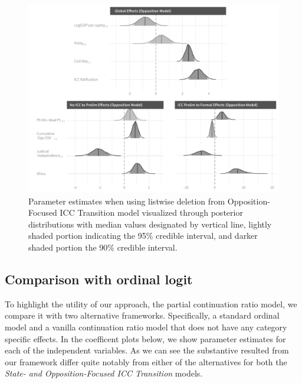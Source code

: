 \begin{figure}
    \centering
    \includegraphics[width=1\textwidth]{rebelCoefSumm_noImp.pdf}
    \caption{Parameter estimates when using listwise deletion from Opposition-Focused ICC Transition model visualized through posterior distributions with median values designated by vertical line, lightly shaded portion indicating the 95\% credible interval, and darker shaded portion the 90\% credible interval.}
    \label{fig:rebelModel_noImp}
\end{figure}

\subsection*{Comparison with ordinal logit}

To highlight the utility of our approach, the partial continuation ratio model, we compare it with two alternative frameworks. Specifically, a standard ordinal model and a vanilla continuation ratio model that does not have any category specific effects.  In the coefficent plots below, we show parameter estimates for each of the independent variables. As we can see the substantive resulted from our framework differ quite notably from either of the alternatives for both the \emph{State- and Opposition-Focused ICC Transition} models.

